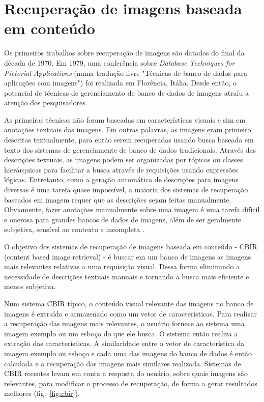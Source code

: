 \chapter{Recuperação de imagens baseada em conteúdo}

Os primeiros trabalhos sobre recuperação de imagens são datados do final da década de 1970. Em 1979, uma conferência sobre \textit{Database Techniques for Pictorial Applications} (numa tradução livre "Técnicas de banco de dados para aplicações com imagens") foi realizada em Florência, Itália. Desde então, o potencial de técnicas de gerenciamento de banco de dados de imagens atraíu a atenção dos pesquisadores.

As primeiras técnicas não foram baseadas em características visuais e sim em anotações textuais das imagens. Em outras palavras, as imagens eram primeiro descritas textualmente, para então serem recuperadas usando busca baseada em texto dos sistemas de gerenciamente de banco de dados tradicionais. Através das descrições textuais, as imagens podem ser organizadas por tópicos ou classes hierárquicas para facilitar a busca através de requisições usando expressões lógicas. Entretanto, como a geração automática de descrições para imagens diversas é uma tarefa quase impossível, a maioria dos sistemas de recuperação baseados em imagem requer que as descrições sejam feitas manualmente. Obviamente, fazer anotações manualmente sobre uma imagem é uma tarefa difícil e onerosa para grandes bancos de dados de imagens, além de ser geralmente subjetiva, sensível ao contexto e incompleta \cite{feng-chapter}.

O objetivo dos sistemas de recuperação de imagens baseada em conteúdo - CBIR (content based image retrieval) - é buscar em um banco de imagens as imagens mais relevantes relativas a uma requisição visual. Dessa forma eliminando a necessidade de descrições textuais manuais e tornando a busca mais eficiente e menos subjetiva.

Num sistema CBIR típico, o conteúdo visual relevante das imagens no banco de imagens é extraído e armazenado como um vetor de características. Para realizar a recuperação das imagens mais relevantes, o usuário fornece ao sistema uma imagem exemplo ou um esboço do que ele busca. O sistema então realiza a extração das características. A similaridade entre o vetor de característica da imagem exemplo ou esboço e cada uma das imagens do banco de dados é então calculada e a recuperação das imagens mais similares realizada. Sistemas de CBIR recentes levam em conta a resposta do usuário, sobre quais imagens são relevantes, para modificar o processo de recuperação, de forma a gerar resultados melhores (fig.~\ref{fig:cbir}).

